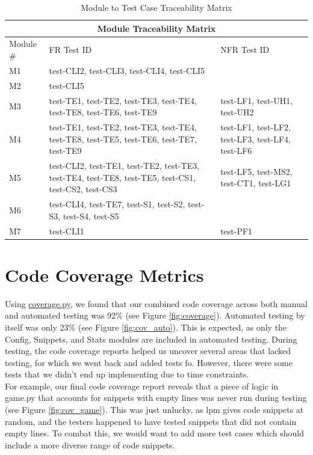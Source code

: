 \documentclass[12pt, titlepage]{article}
\begin{document}
\begin{table}[H]
    \centering
\begin{tabular}{|p{}|p{}|p{}|}
\hline
\multicolumn{3}{|c|}{Module Traceability Matrix} \\ \hline
Module \# & FR Test ID & NFR Test ID \\ \hline
M1 & test-CLI2, test-CLI3, test-CLI4, test-CLI5 & \\ \hline
M2 & test-CLI5 & \\ \hline
M3 & test-TE1, test-TE2, test-TE3, test-TE4, test-TE8, test-TE6, test-TE9 & test-LF1, test-UH1, test-UH2 \\ \hline
M4 & test-TE1, test-TE2, test-TE3, test-TE4, test-TE8, test-TE5, test-TE6, test-TE7, test-TE9 & test-LF1, test-LF2, test-LF3, test-LF4, test-LF6 \\ \hline
M5 & test-CLI2, test-TE1, test-TE2, test-TE3, test-TE4, test-TE8, test-TE5, test-CS1, test-CS2, test-CS3 & test-LF5, test-MS2, test-CT1, test-LG1\\ \hline
M6 &  test-CLI4, test-TE7, test-S1, test-S2, test-S3, test-S4, test-S5 & \\ \hline
M7 & test-CLI1 & test-PF1\\ \hline
\end{tabular}
    \caption{Module to Test Case Traceability Matrix}
    \label{tab:nfrtrace}
\end{table}




\section{Code Coverage Metrics}

Using \href{https://coverage.readthedocs.io/en/coverage-5.5}{coverage.py}, we found that our combined code coverage across both manual and automated testing was 92\% (see Figure \ref{fig:coverage}). Automated testing by itself was only 23\% (see Figure \ref{fig:cov_auto}). This is expected, as only the Config, Snippets, and Stats modules are included in automated testing. During testing, the code coverage reports helped us uncover several areas that lacked testing, for which we went back and added tests fo. However, there were some tests that we didn't end up implementing due to time constraints. \\

For example, our final code coverage report reveals that a piece of logic in game.py that accounts for snippets with empty lines was never run during testing (see Figure \ref{fig:cov_game}). This was just unlucky, as lpm gives code snippets at random, and the testers happened to have tested snippets that did not contain empty lines. To combat this, we would want to add more test cases which should include a more diverse range of code snippets. \\
\end{document}
